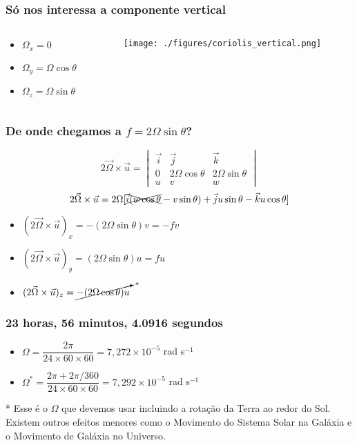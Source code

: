 \begin{frame}
  \frametitle{Só nos interessa a componente vertical}
  \begin{columns}
    \begin{column}{0.5\textwidth}
      \begin{itemize}
        \item $\Omega_x = 0$
        \item $\Omega_y = \Omega\cos\theta$
        \item $\Omega_z = \Omega\sin\theta$
      \end{itemize}
    \end{column}
    \begin{column}{0.5\textwidth}
      \begin{center}
        \texttt{[image: ./figures/coriolis\_vertical.png]}
      \end{center}
    \end{column}
  \end{columns}
\end{frame}

\begin{frame}
  \frametitle{De onde chegamos a $f = 2\Omega\sin{\theta}$?}
  \[
    2\vec{\Omega} \times \vec{u} =
    \begin{vmatrix}
    \vec{i} & \vec{j}           & \vec{k}\\
    0       & 2\Omega\cos\theta & 2\Omega\sin\theta\\
    u       & v                 & w
    \end{vmatrix}
  \]
  \pause
  \[
    2\vec{\Omega} \times \vec{u} =
    2\Omega [\xcancel{\vec{i}(w\cos\theta} - v\sin\theta) +
             \vec{j}u\sin\theta - \vec{k}u\cos\theta]
  \]
  \pause
  \begin{itemize}
    \item $(2\vec{\Omega} \times \vec{u})_x = -(2\Omega\sin\theta)v = -fv$
    \item $(2\vec{\Omega} \times \vec{u})_y = (2\Omega\sin\theta)u = fu$
    \item $(2\vec{\Omega} \times \vec{u})_z = \cancelto{*}{-(2\Omega\cos\theta)u}$
  \end{itemize}
\end{frame}


\begin{frame}
  \frametitle{23 horas, 56 minutos, 4.0916 segundos}
  \begin{itemize}[<+-| alert@+>]
    \item $\Omega = \dfrac{2\pi} {24 \times 60 \times 60} =
           7,272 \times 10^{-5}$ rad s$^{-1}$
    \item $\Omega^* = \dfrac{2\pi + 2\pi/360} {24 \times 60 \times 60} =
           7,292 \times 10^{-5}$ rad s$^{-1}$
  \end{itemize}
  \pause
  \small{* Esse é o $\Omega$ que devemos usar incluindo a rotação da Terra ao
         redor do Sol.  Existem outros efeitos menores como o Movimento do
         Sistema Solar na Galáxia e o Movimento de Galáxia no Universo.}
\end{frame}

